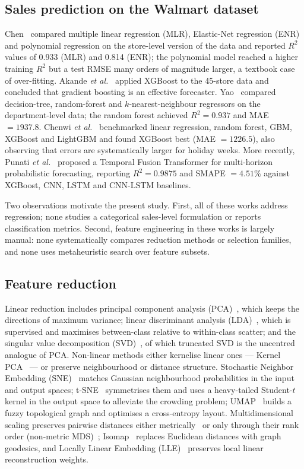 \subsection{Sales prediction on the Walmart dataset}
Chen~\cite{chen2022} compared multiple linear regression (MLR), Elastic-Net regression (ENR) and polynomial regression on the store-level version of the data and reported $R^2$ values of 0.933 (MLR) and 0.814 (ENR); the polynomial model reached a higher training $R^2$ but a test RMSE many orders of magnitude larger, a textbook case of over-fitting. Akande \emph{et al.}~\cite{akande2022} applied XGBoost to the 45-store data and concluded that gradient boosting is an effective forecaster. Yao~\cite{yao2023} compared decision-tree, random-forest and $k$-nearest-neighbour regressors on the department-level data; the random forest achieved $R^2=0.937$ and MAE $=1937.8$. Chenwi \emph{et al.}~\cite{chenwi2024} benchmarked linear regression, random forest, GBM, XGBoost and LightGBM and found XGBoost best (MAE $=1226.5$), also observing that errors are systematically larger for holiday weeks. More recently, Punati \emph{et al.}~\cite{punati2025} proposed a Temporal Fusion Transformer for multi-horizon probabilistic forecasting, reporting $R^2=0.9875$ and SMAPE $=4.51\%$ against XGBoost, CNN, LSTM and CNN-LSTM baselines.

Two observations motivate the present study. First, all of these works address regression; none studies a categorical sales-level formulation or reports classification metrics. Second, feature engineering in these works is largely manual: none systematically compares reduction methods or selection families, and none uses metaheuristic search over feature subsets.

\subsection{Feature reduction}
Linear reduction includes principal component analysis (PCA)~\cite{pearson1901}, which keeps the directions of maximum variance; linear discriminant analysis (LDA)~\cite{fisher1936}, which is supervised and maximises between-class relative to within-class scatter; and the singular value decomposition (SVD)~\cite{golub1970}, of which truncated SVD is the uncentred analogue of PCA. Non-linear methods either kernelise linear ones --- Kernel PCA~\cite{scholkopf1998} --- or preserve neighbourhood or distance structure. Stochastic Neighbor Embedding (SNE)~\cite{hinton2002} matches Gaussian neighbourhood probabilities in the input and output spaces; t-SNE~\cite{vandermaaten2008} symmetrises them and uses a heavy-tailed Student-$t$ kernel in the output space to alleviate the crowding problem; UMAP~\cite{mcinnes2018} builds a fuzzy topological graph and optimises a cross-entropy layout. Multidimensional scaling preserves pairwise distances either metrically~\cite{torgerson1952} or only through their rank order (non-metric MDS)~\cite{kruskal1964}; Isomap~\cite{tenenbaum2000} replaces Euclidean distances with graph geodesics, and Locally Linear Embedding (LLE)~\cite{roweis2000} preserves local linear reconstruction weights.

